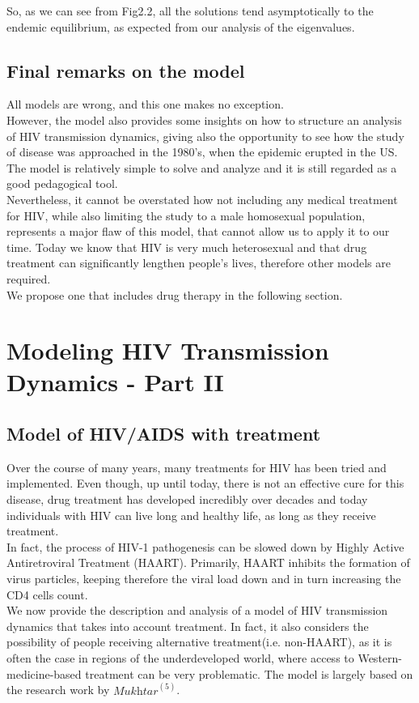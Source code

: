 So, as we can see from Fig2.2, all the solutions tend asymptotically to the endemic equilibrium, as expected from our analysis of the eigenvalues.

\subsection{Final remarks on the model}
All models are wrong, and this one makes no exception.\\
However, the model also provides some insights on how to structure an analysis of HIV transmission dynamics, giving also the opportunity to see how the study of disease was approached in the 1980's, when the epidemic erupted in the US. The model is relatively simple to solve and analyze and it is still regarded as a good pedagogical tool.\\
Nevertheless, it cannot be overstated how not including any medical treatment for HIV, while also limiting the study to a male homosexual population, represents a major flaw of this model, that cannot allow us to apply it to our time. Today we know that HIV is very much heterosexual and that drug treatment can significantly lengthen people's lives, therefore other models are required. \\
We propose one that includes drug therapy in the following section. 

\section{Modeling HIV Transmission Dynamics - Part II}
\subsection{Model of HIV/AIDS with treatment}
Over the course of many years, many treatments for HIV has been tried and implemented. Even though, up until today, there is not an effective cure for this disease, drug treatment has developed incredibly over decades and today individuals with HIV can live long and healthy life, as long as they receive treatment.\\
In fact, the process of HIV-1 pathogenesis can be slowed down by Highly Active Antiretroviral Treatment (HAART). Primarily, HAART inhibits the formation of virus particles, keeping therefore the viral load down and in turn increasing the CD4 cells count.\\
We now provide the description and analysis of a model of HIV transmission dynamics that takes into account treatment. In fact, it also considers the possibility of people receiving alternative treatment(i.e. non-HAART), as it is often the case in regions of the underdeveloped world, where access to Western-medicine-based treatment can be very problematic. The model is largely based on the research work by $\textit{Mukhtar}^{(5)}$.\\

